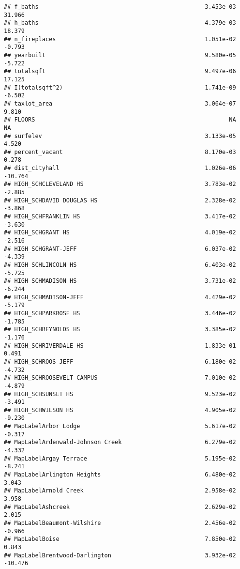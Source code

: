 \documentclass[]{article}
\begin{document}
\begin{verbatim}
## f_baths                                                3.453e-03  31.966
## h_baths                                                4.379e-03  18.379
## n_fireplaces                                           1.051e-02  -0.793
## yearbuilt                                              9.580e-05  -5.722
## totalsqft                                              9.497e-06  17.125
## I(totalsqft^2)                                         1.741e-09  -6.502
## taxlot_area                                            3.064e-07   9.810
## FLOORS                                                        NA      NA
## surfelev                                               3.133e-05   4.520
## percent_vacant                                         8.170e-03   0.278
## dist_cityhall                                          1.026e-06 -10.764
## HIGH_SCHCLEVELAND HS                                   3.783e-02  -2.885
## HIGH_SCHDAVID DOUGLAS HS                               2.328e-02  -3.868
## HIGH_SCHFRANKLIN HS                                    3.417e-02  -3.630
## HIGH_SCHGRANT HS                                       4.019e-02  -2.516
## HIGH_SCHGRANT-JEFF                                     6.037e-02  -4.339
## HIGH_SCHLINCOLN HS                                     6.403e-02  -5.725
## HIGH_SCHMADISON HS                                     3.731e-02  -6.244
## HIGH_SCHMADISON-JEFF                                   4.429e-02  -5.179
## HIGH_SCHPARKROSE HS                                    3.446e-02  -1.785
## HIGH_SCHREYNOLDS HS                                    3.385e-02  -1.176
## HIGH_SCHRIVERDALE HS                                   1.833e-01   0.491
## HIGH_SCHROOS-JEFF                                      6.180e-02  -4.732
## HIGH_SCHROOSEVELT CAMPUS                               7.010e-02  -4.879
## HIGH_SCHSUNSET HS                                      9.523e-02  -3.491
## HIGH_SCHWILSON HS                                      4.905e-02  -9.230
## MapLabelArbor Lodge                                    5.617e-02  -0.317
## MapLabelArdenwald-Johnson Creek                        6.279e-02  -4.332
## MapLabelArgay Terrace                                  5.195e-02  -8.241
## MapLabelArlington Heights                              6.480e-02   3.043
## MapLabelArnold Creek                                   2.958e-02   3.958
## MapLabelAshcreek                                       2.629e-02   2.015
## MapLabelBeaumont-Wilshire                              2.456e-02  -0.966
## MapLabelBoise                                          7.850e-02   0.843
## MapLabelBrentwood-Darlington                           3.932e-02 -10.476

\end{verbatim}
\end{document}
